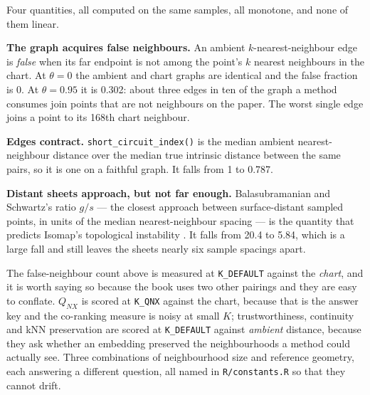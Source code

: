 \documentclass[
  british,
  a4paper,
]{book}
\newenvironment{Shaded}{\begin{snugshade}}{\end{snugshade}}
\newcommand{\AttributeTok}[1]{\textcolor[rgb]{0.13,0.29,0.53}{#1}}
\newcommand{\DataTypeTok}[1]{\textcolor[rgb]{0.13,0.29,0.53}{#1}}
\newcommand{\DecValTok}[1]{\textcolor[rgb]{0.00,0.00,0.81}{#1}}
\newcommand{\FunctionTok}[1]{\textcolor[rgb]{0.13,0.29,0.53}{\textbf{#1}}}
\newcommand{\NormalTok}[1]{#1}
\newcommand{\SpecialCharTok}[1]{\textcolor[rgb]{0.81,0.36,0.00}{\textbf{#1}}}
\newcounter{none} %
\begin{document}
\begin{Shaded}
\end{Shaded}

Four quantities, all computed on the same samples, all monotone, and none of
them linear.

\textbf{The graph acquires false neighbours.} An ambient \(k\)-nearest-neighbour edge
is \emph{false} when its far endpoint is not among the point's \(k\) nearest neighbours
in the chart. At \(\theta = 0\) the ambient and chart graphs are identical and the
false fraction is 0. At \(\theta = 0.95\) it is
0.302: about three edges in ten of the graph a
method consumes join points that are not neighbours on the paper. The worst
single edge joins a point to its 168th chart
neighbour.

\textbf{Edges contract.} \texttt{short\_circuit\_index()} is the median ambient
nearest-neighbour distance over the median true intrinsic distance between the
same pairs, so it is one on a faithful graph. It falls from
1 to 0.787.

\textbf{Distant sheets approach, but not far enough.} Balasubramanian and Schwartz's
ratio \(g/s\) --- the closest approach between surface-distant sampled points, in
units of the median nearest-neighbour spacing --- is the quantity that predicts
Isomap's topological instability \citep{balasubramanian2002isomap}. It falls from
20.4 to 5.84, which
is a large fall and still leaves the sheets nearly six sample spacings apart.

The false-neighbour count above is measured at \texttt{K\_DEFAULT} against the \emph{chart},
and it is worth saying so because the book uses two other pairings and they are
easy to conflate. \(Q_{NX}\) is scored at \texttt{K\_QNX} against the chart, because that
is the answer key and the co-ranking measure is noisy at small \(K\);
trustworthiness, continuity and kNN preservation are scored at \texttt{K\_DEFAULT}
against \emph{ambient} distance, because they ask whether an embedding preserved the
neighbourhoods a method could actually see. Three combinations of neighbourhood
size and reference geometry, each answering a different question, all named in
\texttt{R/constants.R} so that they cannot drift.
\end{document}

